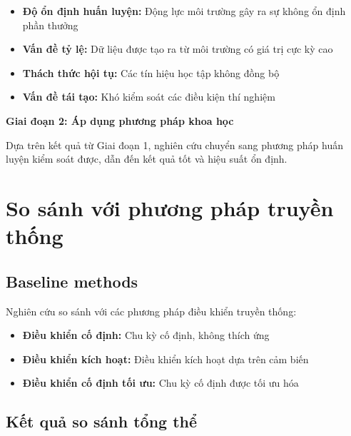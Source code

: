 \begin{itemize}
    \item \textbf{Độ ổn định huấn luyện:} Động lực môi trường gây ra sự không ổn định phần thưởng
    \item \textbf{Vấn đề tỷ lệ:} Dữ liệu được tạo ra từ môi trường có giá trị cực kỳ cao
    \item \textbf{Thách thức hội tụ:} Các tín hiệu học tập không đồng bộ
    \item \textbf{Vấn đề tái tạo:} Khó kiểm soát các điều kiện thí nghiệm
\end{itemize}

\textbf{Giai đoạn 2: Áp dụng phương pháp khoa học}

Dựa trên kết quả từ Giai đoạn 1, nghiên cứu chuyển sang phương pháp huấn luyện kiểm soát
được, dẫn đến kết quả tốt và hiệu suất ổn định.

\section{So sánh với phương pháp truyền thống}

\subsection{Baseline methods}
Nghiên cứu so sánh với các phương pháp điều khiển truyền thống:
\begin{itemize}
    \item \textbf{Điều khiển cố định:} Chu kỳ cố định, không thích ứng

    \item \textbf{Điều khiển kích hoạt:} Điều khiển kích hoạt dựa trên cảm biến

    \item \textbf{Điều khiển cố định tối ưu:} Chu kỳ cố định được tối ưu hóa
\end{itemize}

\subsection{Kết quả so sánh tổng thể}

